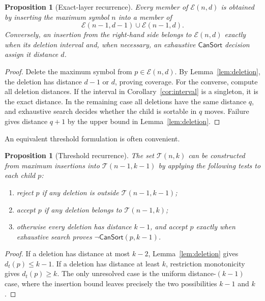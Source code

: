 \documentclass[11pt]{article}
\newtheorem{proposition}[theorem]{Proposition}
\theoremstyle{definition}
\theoremstyle{remark}
\newcommand{\dist}{d_t}
\newcommand{\E}{\mathcal E}
\newcommand{\T}{\mathcal T}
\newcommand{\CanSort}{\mathsf{CanSort}}
\begin{document}
\begin{proposition}[Exact-layer recurrence]
\label{prop:layer-recurrence}
Every member of $\E(n,d)$ is obtained by inserting the maximum symbol $n$
into a member of
\[
  \E(n-1,d-1)\cup\E(n-1,d).                    \tag{3.3}\label{eq:layer-recurrence}
\]
Conversely, an insertion from the right-hand side belongs to $\E(n,d)$
exactly when its deletion interval and, when necessary, an exhaustive
$\CanSort$ decision assign it distance $d$.
\end{proposition}

\begin{proof}
Delete the maximum symbol from $p\in\E(n,d)$.  By
Lemma~\ref{lem:deletion}, the deletion has distance $d-1$ or $d$, proving
coverage.  For the converse, compute all deletion distances.  If the interval
in Corollary~\ref{cor:interval} is a singleton, it is the exact distance.  In
the remaining case all deletions have the same distance $q$, and exhaustive
search decides whether the child is sortable in $q$ moves.  Failure gives
distance $q+1$ by the upper bound in Lemma~\ref{lem:deletion}.
\end{proof}

An equivalent threshold formulation is often convenient.

\begin{proposition}[Threshold recurrence]
\label{prop:threshold}
The set $\T(n,k)$ can be constructed from maximum insertions into
$\T(n-1,k-1)$ by applying the following tests to each child $p$:
\begin{enumerate}[label=(\roman*)]
  \item reject $p$ if any deletion is outside $\T(n-1,k-1)$;
  \item accept $p$ if any deletion belongs to $\T(n-1,k)$;
  \item otherwise every deletion has distance $k-1$, and accept $p$ exactly
    when exhaustive search proves $\neg\CanSort(p,k-1)$.
\end{enumerate}
\end{proposition}

\begin{proof}
If a deletion has distance at most $k-2$, Lemma~\ref{lem:deletion} gives
$\dist(p)\leq k-1$.  If a deletion has distance at least $k$, restriction
monotonicity gives $\dist(p)\geq k$.  The only unresolved case is the uniform
distance-$(k-1)$ case, where the insertion bound leaves precisely the two
possibilities $k-1$ and $k$.
\end{proof}
\end{document}
